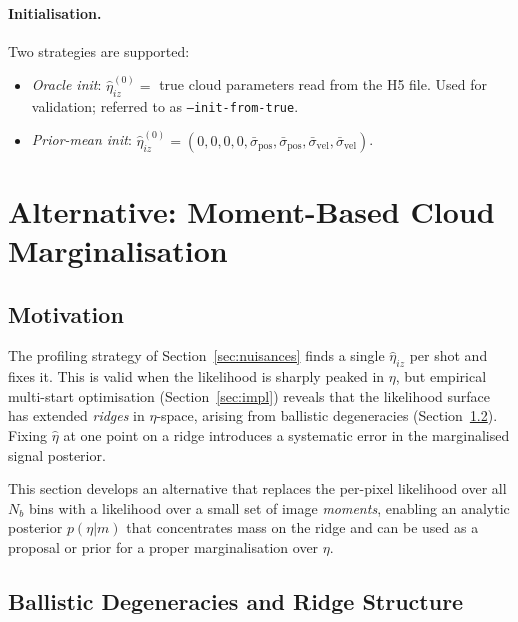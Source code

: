 \documentclass[11pt,a4paper]{article}
\begin{document}
\paragraph{Initialisation.}
Two strategies are supported:
\begin{itemize}
  \item \emph{Oracle init}: $\hat\eta_{iz}^{(0)} =$ true cloud parameters
        read from the H5 file.  Used for validation; referred to as
        \texttt{--init-from-true}.
  \item \emph{Prior-mean init}: $\hat\eta_{iz}^{(0)} = (0,0,0,0,\bar\sigma_\mathrm{pos},
        \bar\sigma_\mathrm{pos},\bar\sigma_\mathrm{vel},\bar\sigma_\mathrm{vel})$.
\end{itemize}

\section{Alternative: Moment-Based Cloud Marginalisation}
\label{sec:moments}

\subsection{Motivation}

The profiling strategy of Section~\ref{sec:nuisances} finds a single
$\hat\eta_{iz}$ per shot and fixes it.  This is valid when the likelihood is
sharply peaked in $\eta$, but empirical multi-start optimisation
(Section~\ref{sec:impl}) reveals that the likelihood surface has extended
\emph{ridges} in $\eta$-space, arising from ballistic degeneracies
(Section~\ref{sec:ridges}).  Fixing $\hat\eta$ at one point on a ridge
introduces a systematic error in the marginalised signal posterior.

This section develops an alternative that replaces the per-pixel likelihood
over all $N_b$ bins with a likelihood over a small set of image
\emph{moments}, enabling an analytic posterior $p(\eta|m)$ that concentrates
mass on the ridge and can be used as a proposal or prior for a proper
marginalisation over $\eta$.

\subsection{Ballistic Degeneracies and Ridge Structure}
\label{sec:ridges}
\end{document}

